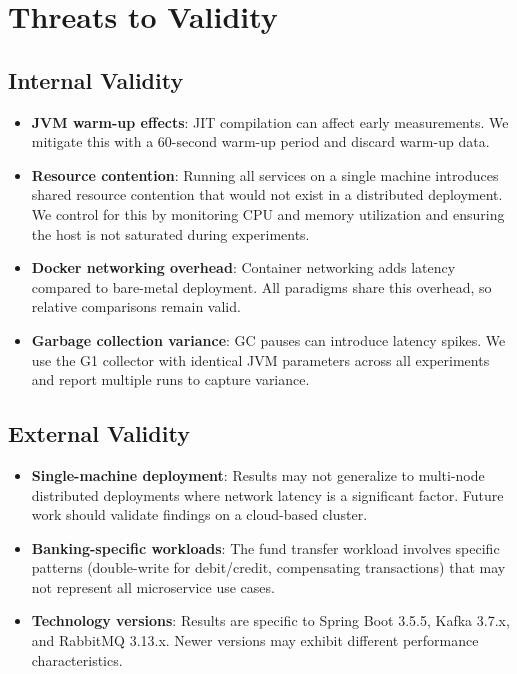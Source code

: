 \documentclass[journal]{IEEEtran}
\begin{document}
\section{Threats to Validity}
\label{sec:threats}

\subsection{Internal Validity}
\label{subsec:internal_validity}

\begin{itemize}
    \item \textbf{JVM warm-up effects}: JIT compilation can affect early measurements. We mitigate this with a 60-second warm-up period and discard warm-up data.
    \item \textbf{Resource contention}: Running all services on a single machine introduces shared resource contention that would not exist in a distributed deployment. We control for this by monitoring CPU and memory utilization and ensuring the host is not saturated during experiments.
    \item \textbf{Docker networking overhead}: Container networking adds latency compared to bare-metal deployment. All paradigms share this overhead, so relative comparisons remain valid.
    \item \textbf{Garbage collection variance}: GC pauses can introduce latency spikes. We use the G1 collector with identical JVM parameters across all experiments and report multiple runs to capture variance.
\end{itemize}

\subsection{External Validity}
\label{subsec:external_validity}

\begin{itemize}
    \item \textbf{Single-machine deployment}: Results may not generalize to multi-node distributed deployments where network latency is a significant factor. Future work should validate findings on a cloud-based cluster.
    \item \textbf{Banking-specific workloads}: The fund transfer workload involves specific patterns (double-write for debit/credit, compensating transactions) that may not represent all microservice use cases.
    \item \textbf{Technology versions}: Results are specific to Spring Boot 3.5.5, Kafka 3.7.x, and RabbitMQ 3.13.x. Newer versions may exhibit different performance characteristics.
\end{itemize}
\end{document}
